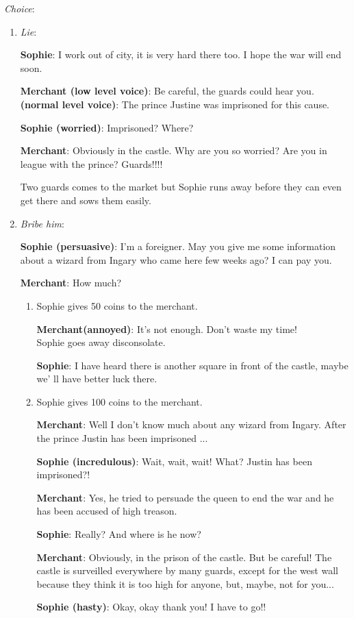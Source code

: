 \textit{Choice}:
\begin{enumerate}
\item \textit{Lie}:
  
  \textbf{Sophie}: I work out of city, it is very hard there too. I hope the war will end soon.
  
  \textbf{Merchant (low level voice)}: Be careful, the guards could hear you. \textbf{(normal level voice)}: The prince Justine was imprisoned for this cause.
  
  \textbf{Sophie (worried)}: Imprisoned? Where? 

  \textbf{Merchant}: Obviously in the castle. Why are you so worried? Are you in league with the prince? Guards!!!!

  Two guards comes to the market but Sophie runs away before they can even get there and sows them easily. 
  
\item \textit{Bribe him}:
  
  \textbf{Sophie (persuasive)}: I'm a foreigner. May you give me some information about a wizard from Ingary who came here few weeks ago? I can pay you.
  
  \textbf{Merchant}: How much?
  
  \begin{enumerate}
  \item Sophie gives 50 coins to the merchant.

    \textbf{Merchant(annoyed)}: It’s not enough. Don’t waste my time!\\

    Sophie goes away disconsolate.
    
    \textbf{Sophie}: I have heard there is another square in front of the castle, maybe we' ll have better luck there.

  \item Sophie gives 100 coins to the merchant.
    
    \textbf{Merchant}: Well I don't know much about any wizard from Ingary. After the prince Justin has been imprisoned ...

    \textbf{Sophie (incredulous)}: Wait, wait, wait! What? Justin has been imprisoned?!
    
    \textbf{Merchant}: Yes, he tried to persuade the queen to end the war and he has been accused of high treason.
    
    \textbf{Sophie}: Really? And where is he now?
    
    \textbf{Merchant}: Obviously, in the prison of the castle. But be careful! The castle is surveilled everywhere by many guards, except for the west wall because they think it is too high for anyone, but, maybe, not for you...
    
    \textbf{Sophie (hasty)}: Okay, okay thank you! I have to go!!
  \end{enumerate}
\end{enumerate}


